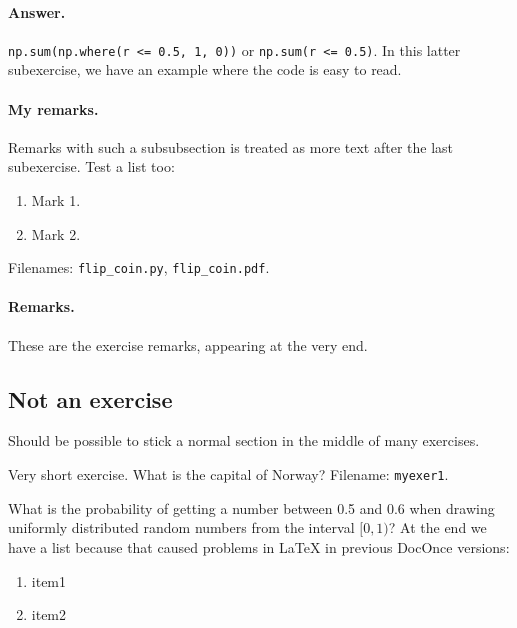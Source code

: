 \documentclass[%
oneside,                 %
final,                   %
10pt]{article}
\newenvironment{doconceexercise}{}{}
\newcounter{doconceexercisecounter}
\theoremstyle{definition}
\begin{document}
\begin{enumerate}
\begin{doconceexercise}
\paragraph{Answer.}
\texttt{np.sum(np.where(r <= 0.5, 1, 0))} or \texttt{np.sum(r <= 0.5)}.
In this latter subexercise, we have an
example where the code is easy to read.
\paragraph{My remarks.}
Remarks with such a subsubsection is treated as more text
after the last subexercise. Test a list too:
\begin{enumerate}
\item Mark 1.
\item Mark 2.
\end{enumerate}
\noindent
\noindent Filenames: \Verb!flip_coin.py!, \Verb!flip_coin.pdf!.
\paragraph{Remarks.}
These are the exercise remarks, appearing at the very end.
\end{doconceexercise}
\subsection{Not an exercise}
Should be possible to stick a normal section in the middle of many
exercises.
\begin{doconceexercise}
                             
\label{my:exer1}
Very short exercise. What is the capital
of Norway?
\noindent Filename: \texttt{myexer1}.
\end{doconceexercise}
\begin{doconceexercise}
                             
\label{demo:ex:2}
What is the probability of getting a number between 0.5 and 0.6 when
drawing uniformly distributed random numbers from the interval $[0,1)$?
At the end we have a list because that caused problems in {\LaTeX}
in previous DocOnce versions:
\begin{enumerate}
\item item1
\item item2
\end{enumerate}
\noindent

\end{doconceexercise}
\end{enumerate}
\end{document}
